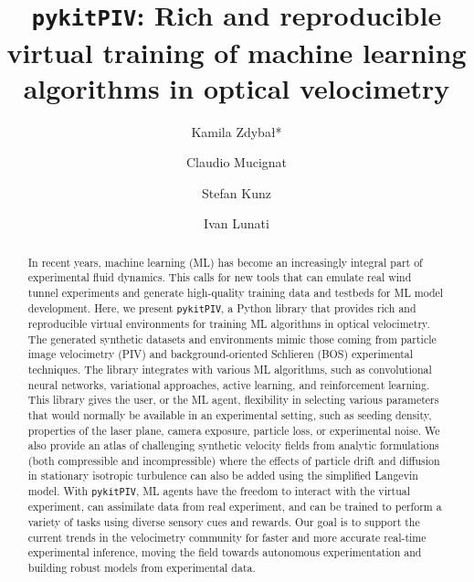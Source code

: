 \documentclass[a4paper,fleqn]{cas-dc}
\begin{document}

\title [mode = title]{\texttt{pykitPIV}: Rich and reproducible virtual training of machine learning algorithms in optical velocimetry}

\author[EMPA]{Kamila Zdyba\l{}*}

\author[EMPA]{Claudio Mucignat}
\author[EMPA]{Stefan Kunz}
\author[EMPA]{Ivan Lunati}

\address[EMPA]{Laboratory for Computational Engineering, Swiss Federal Laboratories for Materials Science and Technology, Empa, Dübendorf, Switzerland}

\begin{abstract}
In recent years, machine learning (ML) has become an increasingly integral part of experimental fluid dynamics. 
This calls for new tools that can emulate real wind tunnel experiments and generate high-quality training data and testbeds for ML model development.
Here, we present \texttt{pykitPIV}, a Python library that provides rich and reproducible virtual environments for training ML algorithms in optical velocimetry. The generated synthetic datasets and environments mimic those coming from particle image velocimetry (PIV) and background-oriented Schlieren (BOS) experimental techniques. 
The library integrates with various ML algorithms, such as convolutional neural networks, variational approaches, active learning, and reinforcement learning. This library gives the user, or the ML agent, flexibility in selecting various parameters that would normally be available in an experimental setting, such as seeding density, properties of the laser plane, camera exposure, particle loss, or experimental noise. We also provide an atlas of challenging synthetic velocity fields from analytic formulations (both compressible and incompressible) where the effects of particle drift and diffusion in stationary isotropic turbulence can also be added using the simplified Langevin model.
With \texttt{pykitPIV}, ML agents have the freedom to interact with the virtual experiment, can assimilate data from real experiment, and can be trained to perform a variety of tasks using diverse sensory cues and rewards. Our goal is to support the current trends in the velocimetry community for faster and more accurate real-time experimental inference, moving the field towards autonomous experimentation and building robust models from experimental data.
\end{abstract}
\end{document}
